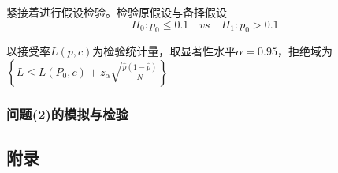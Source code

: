 \documentclass[a4paper,12pt]{ctexart} %
\begin{document}
紧接着进行假设检验。检验原假设与备择假设
$$H_0:p_0 \leqslant0.1 \quad vs \quad H_1:p_0>0.1$$

以接受率$L\left( p,c \right)$为检验统计量，取显著性水平$\alpha = 0.95$，拒绝域为$\left\{ L\leqslant L\left( P_0,c \right) +z_{\alpha}\sqrt{\frac{\hat{p}\left( 1-\hat{p} \right)}{N}} \right\} $


\subsubsection{问题(2)的模拟与检验}

\begin{appendix}

\section{附录}

\end{appendix}
\end{document}
